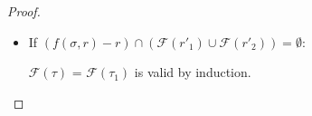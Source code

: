 {\begin{proof}
\begin{itemize}
\begin{itemize}
             $\mathcal{F}(\tau) $ has the root $(r'_0 - f(\sigma,\sigma)):\sigma$ , Assume $r'$ to be valid, 
             then either $f(\sigma,r')$[1] or $f(\sigma,r')$[2]  should be intuitionistically valid then either $r'_1 \supseteq  f(\sigma,r')[2]$ or $r'_1 \supseteq  f(\sigma,r')[2]$ should be intuitionistically valid. 
             We know, by induction, that both are intuitionistically invalid.

             \item
             If $(f(\sigma,r) - r) \cap (\mathcal{F}(r'_1) \cup \mathcal{F}(r'_2) ) = \emptyset $: 
             
             $\mathcal{F}(\tau) $ = $\mathcal{F}(\tau_1) $ is valid by induction.
        \end{itemize}
    
        \end{itemize}
    
    \end{proof}
}



